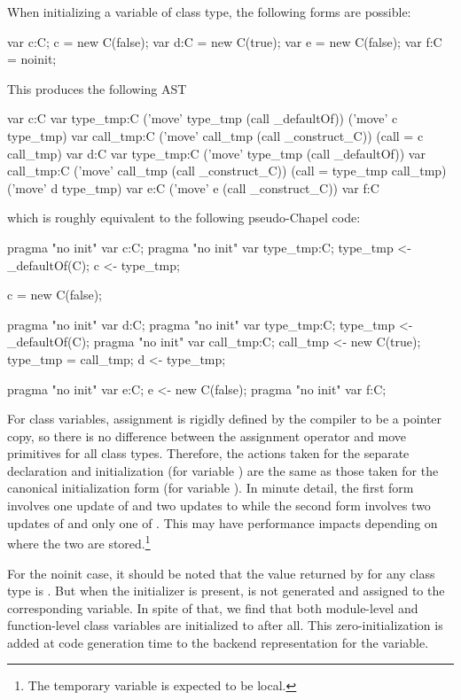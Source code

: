 When initializing a variable of class type, the following forms are possible:
\begin{chapel}
  var c:C; c = new C(false);
  var d:C = new C(true);
  var e = new C(false);
  var f:C = noinit;
\end{chapel}
\noindent
This produces the following AST
\begin{chapelcode}
    var c:C
    {
      var type_tmp:C
      ('move' type_tmp (call _defaultOf))
      ('move' c type_tmp)
    }
    var call_tmp:C
    ('move' call_tmp (call _construct_C))
    (call = c call_tmp)
    var d:C
    {
      var type_tmp:C
      ('move' type_tmp (call _defaultOf))
      var call_tmp:C
      ('move' call_tmp (call _construct_C))
      (call = type_tmp call_tmp)
      ('move' d type_tmp)
    }
    var e:C
    ('move' e (call _construct_C))
    var f:C
\end{chapelcode}
\noindent
which is roughly equivalent to the following pseudo-Chapel code:
\begin{chapel}
  pragma "no init" var c:C;
  pragma "no init" var type_tmp:C; type_tmp <- _defaultOf(C);
  c <- type_tmp;

  c = new C(false);

  pragma "no init" var d:C; 
  pragma "no init" var type_tmp:C; type_tmp <- _defaultOf(C);
  pragma "no init" var call_tmp:C; call_tmp <- new C(true);
  type_tmp = call_tmp;
  d <- type_tmp;

  pragma "no init" var e:C; e <- new C(false);
  pragma "no init" var f:C;
\end{chapel}
\noindent
For class variables, assignment is rigidly defined by the compiler to be a pointer copy,
so there is no difference between the assignment operator and move primitives for all
class types.  Therefore, the actions taken for the separate declaration and initialization
(for variable ) are the same as those taken for the canonical initialization form
(for variable ).  In minute detail, the first form involves one update of
 and two updates to  while the second form involves two updates of
 and only one of .  This may have performance impacts depending on
where the two are stored.\footnote{The temporary variable  is expected to
  be local.}

For the noinit case, it should be noted that the value returned by  for
any class type is .  But when the  initializer is present,
 is not generated and assigned to the corresponding variable.  In spite of
that, we find that both module-level and function-level class variables are initialized to
 after all.  This zero-initialization is added at code generation time to the
backend representation for the variable.  

